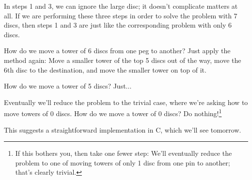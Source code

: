 In steps 1 and 3, we can ignore the large disc; it doesn't complicate
matters at all.  If we are performing these three steps in order to
solve the problem with 7 discs, then steps 1 and 3 are just like the
corresponding problem with only 6 discs.

How do we move a tower of 6 discs from one peg to another?  Just
apply the method again:  Move a smaller tower of the top 5 discs out of
the way, move the 6th disc to the destination, and move the smaller
tower on top of it.

How do we move a tower of 5 discs?  Just...

Eventually we'll reduce the problem to the trivial case, where we're
asking how to move towers of 0 discs.  How do we move a tower of 0
discs?  Do nothing!\footnote{If this bothers you, then take one fewer
step:  We'll eventually reduce the problem to one of moving towers of
only 1 disc from one pin to another; that's clearly trivial.}

This suggests a straightforward implementation in C, which we'll see
tomorrow.  


